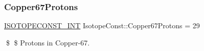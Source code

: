 \subsubsection{\texorpdfstring{Copper67\+Protons}{Copper67Protons}}
{\footnotesize\ttfamily \mbox{\hyperlink{group___isotope_const-_macros_ga5f18360b3e99483a35c32d789e62621c}{I\+S\+O\+T\+O\+P\+E\+C\+O\+N\+S\+T\+\_\+\+I\+NT}} Isotope\+Const\+::\+Copper67\+Protons = 29}

\$ \$ Protons in Copper-\/67. 